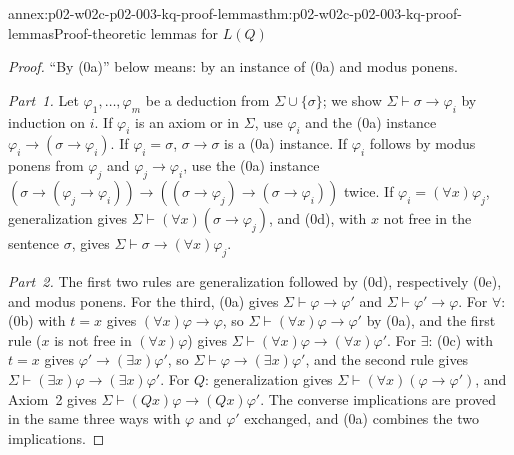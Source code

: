 \begin{annexitem}{annex:p02-w02c-p02-003-kq-proof-lemmas}{thm:p02-w02c-p02-003-kq-proof-lemmas}{Proof-theoretic lemmas for \(L(Q)\)}
\begin{proof}
``By (0a)'' below means: by an instance of (0a) and modus ponens.

\emph{Part~1.}  Let \(\varphi_1,\ldots,\varphi_m\) be a deduction from
\(\Sigma\cup\{\sigma\}\); we show \(\Sigma\vdash\sigma\to\varphi_i\) by
induction on \(i\).  If \(\varphi_i\) is an axiom or in \(\Sigma\), use
\(\varphi_i\) and the (0a) instance \(\varphi_i\to(\sigma\to\varphi_i)\).
If \(\varphi_i=\sigma\), \(\sigma\to\sigma\) is a (0a) instance.  If
\(\varphi_i\) follows by modus ponens from \(\varphi_j\) and
\(\varphi_j\to\varphi_i\), use the (0a) instance
\((\sigma\to(\varphi_j\to\varphi_i))\to((\sigma\to\varphi_j)\to(\sigma\to\varphi_i))\)
twice.  If \(\varphi_i=(\forall x)\varphi_j\), generalization gives
\(\Sigma\vdash(\forall x)(\sigma\to\varphi_j)\), and (0d), with \(x\) not
free in the sentence \(\sigma\), gives \(\Sigma\vdash\sigma\to(\forall
x)\varphi_j\).

\emph{Part~2.}  The first two rules are generalization followed by (0d),
respectively (0e), and modus ponens.  For the third, (0a) gives
\(\Sigma\vdash\varphi\to\varphi'\) and \(\Sigma\vdash\varphi'\to\varphi\).
For \(\forall\): (0b) with \(t=x\) gives \((\forall x)\varphi\to\varphi\),
so \(\Sigma\vdash(\forall x)\varphi\to\varphi'\) by (0a), and the first rule
(\(x\) is not free in \((\forall x)\varphi\)) gives
\(\Sigma\vdash(\forall x)\varphi\to(\forall x)\varphi'\).  For \(\exists\):
(0c) with \(t=x\) gives \(\varphi'\to(\exists x)\varphi'\), so
\(\Sigma\vdash\varphi\to(\exists x)\varphi'\), and the second rule gives
\(\Sigma\vdash(\exists x)\varphi\to(\exists x)\varphi'\).  For \(Q\):
generalization gives \(\Sigma\vdash(\forall x)(\varphi\to\varphi')\), and
Axiom~2 gives \(\Sigma\vdash(Qx)\varphi\to(Qx)\varphi'\).  The converse
implications are proved in the same three ways with \(\varphi\) and
\(\varphi'\) exchanged, and (0a) combines the two implications.


\end{proof}
\end{annexitem}
